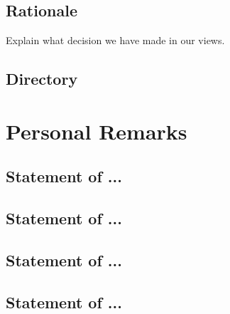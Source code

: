 \documentclass{article}
\begin{document}
	\subsection{Rationale}
	Explain what decision we have made in our views.

	\subsection{Directory}


	\section{Personal Remarks}
	\subsection{Statement of ...}
	\subsection{Statement of ...}
	\subsection{Statement of ...}
	\subsection{Statement of ...}
\end{document}
